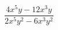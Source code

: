 \begin{ex}[type=expression]
	\begin{condition}
		\(\dfrac{4x^5y-12x^3y}{2x^5y^2-6x^3y^2}\)
	\end{condition}
\end{ex}